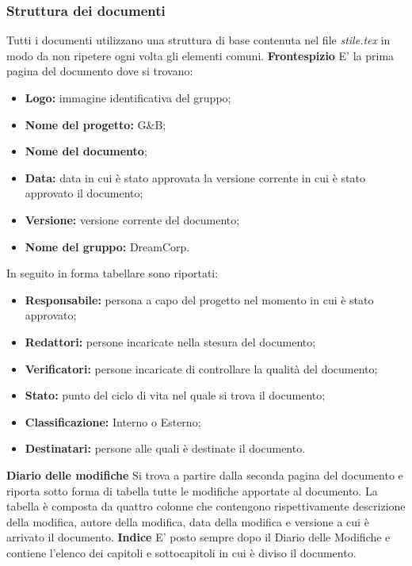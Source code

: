 		\subsubsection{Struttura dei documenti}
			Tutti i documenti utilizzano una struttura di base contenuta nel file \textit{stile.tex} in modo da non ripetere ogni volta gli elementi comuni.
			\newline \newline \textbf{Frontespizio} E' la prima pagina del documento dove si trovano:
			\begin{itemize}
				\item \textbf{Logo:} immagine identificativa del gruppo;
				\item \textbf{Nome del progetto:} G\&B;
				\item \textbf{Nome del documento};
				\item \textbf{Data:} data in cui è stato approvata la versione corrente in cui è stato approvato il documento;
				\item \textbf{Versione:} versione corrente del documento;
				\item \textbf{Nome del gruppo:} DreamCorp.
			\end{itemize}
			In seguito in forma tabellare sono riportati:
			\begin{itemize}
				\item \textbf{Responsabile:} persona a capo del progetto nel momento in cui è stato approvato;
				\item \textbf{Redattori:} persone incaricate nella stesura del documento;
				\item \textbf{Verificatori:} persone incaricate di controllare la qualità del documento;
				\item \textbf{Stato:} punto del ciclo di vita nel quale si trova il documento;
				\item \textbf{Classificazione:} Interno o Esterno;
				\item \textbf{Destinatari:} persone alle quali è destinate il documento.
			\end{itemize}
		\textbf{Diario delle modifiche}  Si trova a partire dalla seconda pagina del documento e riporta sotto forma di tabella tutte le modifiche apportate al documento. La tabella è composta da quattro colonne che contengono rispettivamente descrizione della modifica, autore della modifica, data della modifica e versione a cui è arrivato il documento.
		\newline \newline \textbf{Indice}  E' posto sempre dopo il Diario delle Modifiche e contiene l'elenco dei capitoli e sottocapitoli in cui è diviso il documento.
